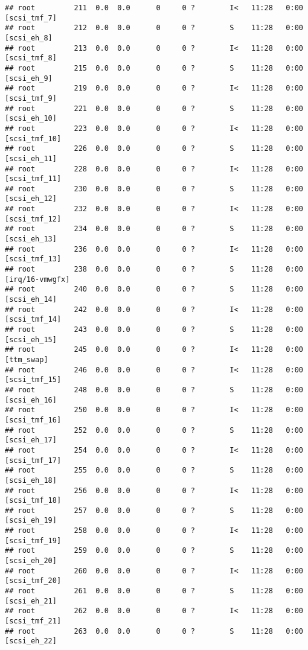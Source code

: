 \documentclass[]{article}
\begin{document}
\begin{verbatim}
## root         211  0.0  0.0      0     0 ?        I<   11:28   0:00 [scsi_tmf_7]
## root         212  0.0  0.0      0     0 ?        S    11:28   0:00 [scsi_eh_8]
## root         213  0.0  0.0      0     0 ?        I<   11:28   0:00 [scsi_tmf_8]
## root         215  0.0  0.0      0     0 ?        S    11:28   0:00 [scsi_eh_9]
## root         219  0.0  0.0      0     0 ?        I<   11:28   0:00 [scsi_tmf_9]
## root         221  0.0  0.0      0     0 ?        S    11:28   0:00 [scsi_eh_10]
## root         223  0.0  0.0      0     0 ?        I<   11:28   0:00 [scsi_tmf_10]
## root         226  0.0  0.0      0     0 ?        S    11:28   0:00 [scsi_eh_11]
## root         228  0.0  0.0      0     0 ?        I<   11:28   0:00 [scsi_tmf_11]
## root         230  0.0  0.0      0     0 ?        S    11:28   0:00 [scsi_eh_12]
## root         232  0.0  0.0      0     0 ?        I<   11:28   0:00 [scsi_tmf_12]
## root         234  0.0  0.0      0     0 ?        S    11:28   0:00 [scsi_eh_13]
## root         236  0.0  0.0      0     0 ?        I<   11:28   0:00 [scsi_tmf_13]
## root         238  0.0  0.0      0     0 ?        S    11:28   0:00 [irq/16-vmwgfx]
## root         240  0.0  0.0      0     0 ?        S    11:28   0:00 [scsi_eh_14]
## root         242  0.0  0.0      0     0 ?        I<   11:28   0:00 [scsi_tmf_14]
## root         243  0.0  0.0      0     0 ?        S    11:28   0:00 [scsi_eh_15]
## root         245  0.0  0.0      0     0 ?        I<   11:28   0:00 [ttm_swap]
## root         246  0.0  0.0      0     0 ?        I<   11:28   0:00 [scsi_tmf_15]
## root         248  0.0  0.0      0     0 ?        S    11:28   0:00 [scsi_eh_16]
## root         250  0.0  0.0      0     0 ?        I<   11:28   0:00 [scsi_tmf_16]
## root         252  0.0  0.0      0     0 ?        S    11:28   0:00 [scsi_eh_17]
## root         254  0.0  0.0      0     0 ?        I<   11:28   0:00 [scsi_tmf_17]
## root         255  0.0  0.0      0     0 ?        S    11:28   0:00 [scsi_eh_18]
## root         256  0.0  0.0      0     0 ?        I<   11:28   0:00 [scsi_tmf_18]
## root         257  0.0  0.0      0     0 ?        S    11:28   0:00 [scsi_eh_19]
## root         258  0.0  0.0      0     0 ?        I<   11:28   0:00 [scsi_tmf_19]
## root         259  0.0  0.0      0     0 ?        S    11:28   0:00 [scsi_eh_20]
## root         260  0.0  0.0      0     0 ?        I<   11:28   0:00 [scsi_tmf_20]
## root         261  0.0  0.0      0     0 ?        S    11:28   0:00 [scsi_eh_21]
## root         262  0.0  0.0      0     0 ?        I<   11:28   0:00 [scsi_tmf_21]
## root         263  0.0  0.0      0     0 ?        S    11:28   0:00 [scsi_eh_22]

\end{verbatim}
\end{document}
